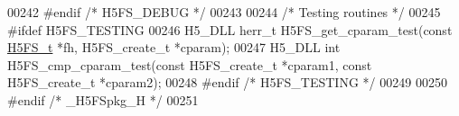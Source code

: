 \begin{DoxyCode}
00242 \textcolor{preprocessor}{#endif }\textcolor{comment}{/* H5FS\_DEBUG */}\textcolor{preprocessor}{}
00243 
00244 \textcolor{comment}{/* Testing routines */}
00245 \textcolor{preprocessor}{#ifdef H5FS\_TESTING}
00246 H5\_DLL herr\_t H5FS\_get\_cparam\_test(\textcolor{keyword}{const} \hyperlink{struct_h5_f_s__t}{H5FS\_t} *fh, H5FS\_create\_t *cparam);
00247 H5\_DLL \textcolor{keywordtype}{int} H5FS\_cmp\_cparam\_test(\textcolor{keyword}{const} H5FS\_create\_t *cparam1, \textcolor{keyword}{const} H5FS\_create\_t *cparam2);
00248 \textcolor{preprocessor}{#endif }\textcolor{comment}{/* H5FS\_TESTING */}\textcolor{preprocessor}{}
00249 
00250 \textcolor{preprocessor}{#endif }\textcolor{comment}{/* \_H5FSpkg\_H */}\textcolor{preprocessor}{}
00251 
\end{DoxyCode}

